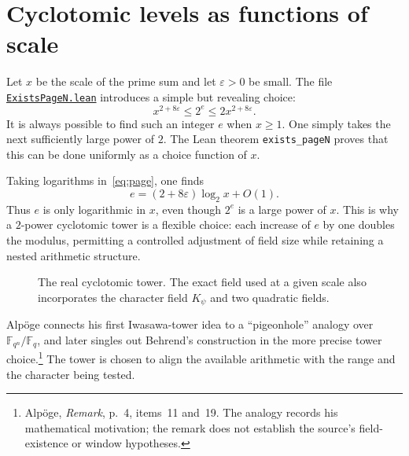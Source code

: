\documentclass[11pt,openany,oneside]{scrbook}
\theoremstyle{definition}
\theoremstyle{remark}
\newcommand{\QQ}{\mathbb Q}
\newcommand{\F}{\mathbb F}
\newcommand{\eps}{\varepsilon}
\newcommand{\baseurl}{https://github.com/CocoSgt/riemann-hypothesis-lean/blob/7cbf7a0c32fca1badf05931879a37c3f8a2b03b4/}
\newcommand{\sourcefile}[2]{\href{\baseurl#1}{\texttt{#2}}}
\begin{document}
\section{Cyclotomic levels as functions of scale}

Let $x$ be the scale of the prime sum and let $\eps>0$ be small. The file
\sourcefile{src/Development/AutomorphicArithmetic/CharacterBoxes/ExistsPageN.lean}{ExistsPageN.lean}
introduces a simple but revealing choice:
\begin{equation}\label{eq:page}
x^{2+8\eps}\le2^e\le2x^{2+8\eps}.
\end{equation}
It is always possible to find such an integer $e$ when $x\ge1$. One simply takes the next sufficiently large power of $2$. The Lean theorem \texttt{exists\_pageN} proves that this can be done uniformly as a choice function of $x$.

Taking logarithms in~\eqref{eq:page}, one finds
\[
e=(2+8\eps)\log_2 x+O(1).
\]
Thus $e$ is only logarithmic in $x$, even though $2^e$ is a large power of $x$. This is why a $2$-power cyclotomic tower is a flexible choice: each increase of $e$ by one doubles the modulus, permitting a controlled adjustment of field size while retaining a nested arithmetic structure.

\begin{figure}[ht]
\centering
{}
\caption{The real cyclotomic tower. The exact field used at a given scale also incorporates the character field $K_\psi$ and two quadratic fields.}
\end{figure}

Alp\"oge connects his first Iwasawa-tower idea to a ``pigeonhole'' analogy over $\F_{q^n}/\F_q$, and later singles out Behrend's construction in the more precise tower choice.\footnote{Alp\"oge, \emph{Remark}, p.~4, items~11 and~19. The analogy records his mathematical motivation; the remark does not establish the source's field-existence or window hypotheses.} The tower is chosen to align the available arithmetic with the range and the character being tested.
\end{document}
